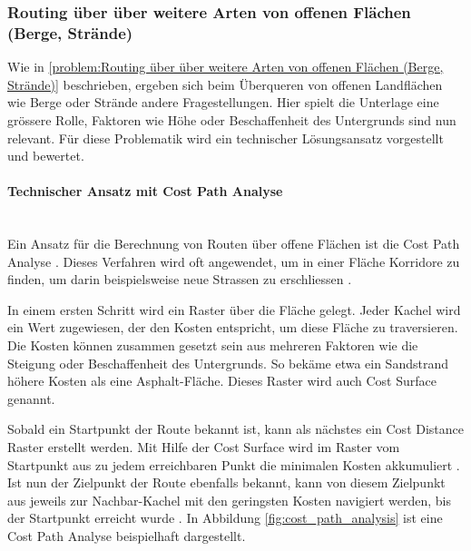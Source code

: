\subsubsection{Routing über über weitere Arten von offenen Flächen (Berge, Strände)}
\label{subsub:Routing über über weitere Arten von offenen Flächen (Berge, Strände)}

Wie in \ref{problem:Routing über über weitere Arten von offenen Flächen (Berge, Strände)} beschrieben, ergeben sich beim Überqueren von offenen Landflächen wie Berge oder Strände andere Fragestellungen. Hier spielt die Unterlage eine grössere Rolle, Faktoren wie Höhe oder Beschaffenheit des Untergrunds sind nun relevant. Für diese Problematik wird ein technischer Lösungsansatz vorgestellt und bewertet.

\paragraph{Technischer Ansatz mit Cost Path Analyse}~\\
Ein Ansatz für die Berechnung von Routen über offene Flächen ist die Cost Path Analyse \cite{cost_path_analysis}. Dieses Verfahren wird oft angewendet, um in einer Fläche Korridore zu finden, um darin beispielsweise neue Strassen zu erschliessen \cite{gis-wiki:cost-path-analysis}.

In einem ersten Schritt wird ein Raster über die Fläche gelegt. Jeder Kachel wird ein Wert zugewiesen, der den Kosten entspricht, um diese Fläche zu traversieren. Die Kosten können zusammen gesetzt sein aus mehreren Faktoren wie die Steigung oder Beschaffenheit des Untergrunds. So bekäme etwa ein Sandstrand höhere Kosten als eine Asphalt-Fläche. Dieses Raster wird auch Cost Surface genannt. \cite{gid_fundamentals}

Sobald ein Startpunkt der Route bekannt ist, kann als nächstes ein Cost Distance Raster erstellt werden. Mit Hilfe der Cost Surface wird im Raster vom Startpunkt aus zu jedem erreichbaren Punkt die minimalen Kosten akkumuliert \cite{geospatial_analysis}. Ist nun der Zielpunkt der Route ebenfalls bekannt, kann von diesem Zielpunkt aus jeweils zur Nachbar-Kachel mit den geringsten Kosten navigiert werden, bis der Startpunkt erreicht wurde \cite{cost_path_analysis}. In Abbildung \ref{fig:cost_path_analysis} ist eine Cost Path Analyse beispielhaft dargestellt.


